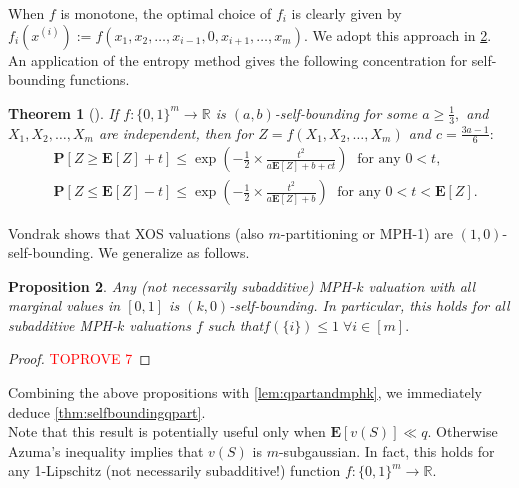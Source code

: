 \documentclass[11pt]{article}\usepackage{amsfonts}
\newtheorem{theorem}{Theorem}
\newtheorem{proposition}[theorem]{Proposition}
\numberwithin{theorem}{subsection}
\newcommand{\prob}{\mathbf{P}}
\newcommand{\expect}{\mathbf{E}}
\begin{document}
\noindent
When $f$ is monotone, the optimal choice of $f_i$ is clearly given by\linebreak
$f_i(x^{(i)}):=f(x_1, x_2, \ldots, x_{i-1},0, x_{i+1}, \ldots, x_m).$ We adopt this approach in \cref{lem:MPHslefbounding}.
An application of the entropy method gives the following concentration for self-bounding functions.

\begin{theorem}[{\cite[Theorem 3.3]{Vondrak10}}]If $f:\{0,1\}^m\longrightarrow \mathbb{R}$ is $(a,b)$-self-bounding for some $a\ge \frac{1}{3},$ and $X_1, X_2, \ldots, X_m$ are independent, then for $Z = f(X_1, X_2, \ldots, X_m)$ and $c = \frac{3a-1}{6}:$
\begin{equation*}
\begin{split}
    & \prob[Z\ge \expect[Z] + t]\le
\exp\left(-\frac{1}{2}\times\frac{t^2}{a\expect[Z] + b + ct}\right)\; \text{ for any }0<t,\\
    &
     \prob[Z\le \expect[Z] - t]\le
     \exp\left(-\frac{1}{2}\times\frac{t^2}{a\expect[Z] + b}\right)\;\text{ for any }0<t<\expect[Z].
\end{split}
\end{equation*}
\end{theorem}

\noindent
Vondrak \cite[Lemma 2.2]{Vondrak10} shows that XOS valuations (also $m$-partitioning or MPH-1) are $(1,0)$-self-bounding.
We generalize as follows.

\begin{proposition}
\label{lem:MPHslefbounding}
Any (not necessarily subadditive) MPH-$k$ valuation with all marginal values in $[0,1]$ is $(k,0)$-self-bounding. In particular, this holds for all subadditive MPH-$k$ valuations $f$ such that\linebreak $f(\{i\})\le 1\; \forall i \in [m].$
\end{proposition}
\begin{proof}\textcolor{red}{TOPROVE 7}\end{proof}

\noindent
Combining the above propositions with \cref{lem:qpartandmphk}, we immediately deduce \cref{thm:selfboundingqpart}.\\

\noindent
Note that this result is potentially useful only when $\expect[v(S)] \ll q.$ Otherwise Azuma's inequality \cite{Azuma} implies that $v(S)$ is $m$-subgaussian. In fact, this holds for any 1-Lipschitz (not necessarily subadditive!) function $f:\{0,1\}^m\longrightarrow \mathbb{R}.$\\
\end{document}
